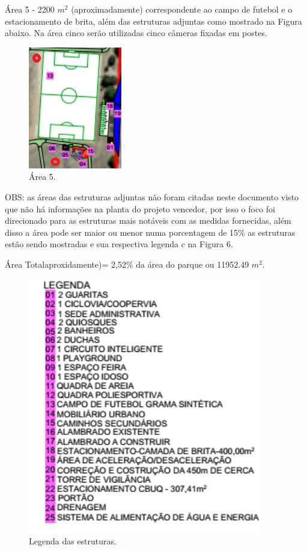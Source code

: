 Área 5 - 2200 $m^{2}$ (aproximadamente) correspondente ao campo de futebol e o estacionamento de brita, além das estruturas adjuntas como mostrado  na Figura abaixo. Na área cinco serão utilizadas cinco câmeras fixadas em postes.

\begin{figure}[H]
	 \centering
	\label{Área 5}
	 \includegraphics[keepaspectratio=true,scale=0.8]{monitoramento/5.png}
	 \caption{Área 5.}
\end{figure}

OBS: as áreas das estruturas adjuntas não foram citadas neste documento visto que não há informações na planta do projeto vencedor, por isso o foco foi direcionado para as estruturas mais notáveis com as medidas fornecidas, além disso a área pode ser maior ou menor numa porcentagem de 15\% as estruturas estão sendo mostradas e sua respectiva legenda c na Figura 6.


Área Totalaproxidamente)= 2,52\% da área do parque ou 11952.49 $m^{2}$.

\begin{figure}[H]
	 \centering
	\label{Legenda das estruturas}
	 \includegraphics[keepaspectratio=true,scale=0.8]{monitoramento/6.png}
	 \caption{Legenda das estruturas.}
\end{figure}

